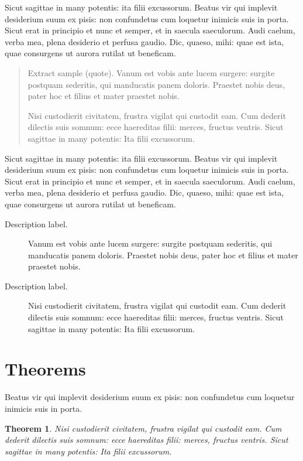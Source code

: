 \documentclass[numbers,compress]{vmsta2}
\newtheorem{thm}{Theorem}
\theoremstyle{definition}
\begin{document}
Sicut sagittae in many potentis: ita filii excussorum. Beatus vir qui
implevit desi\-derium suum ex pisis: non confundetus cum loquetur inimicis
suis in porta.  Sicut erat in principio et nunc et semper, et in saecula
saeculorum. Audi caelum, verba mea, plena desiderio et perfusa gaudio.
Dic, quaeso, mihi: quae est ista, quae consurgens ut aurora rutilat ut
beneficam.

\begin{quote}
Extract sample (quote). Vanum est vobis ante lucem surgere: surgite postquam
sederitis, qui manducatis panem doloris. Praestet nobis deus, pater
hoc et filius et mater praestet nobis.

Nisi custodierit civitatem,
frustra vigilat qui custodit eam. Cum dederit dilectis suis somnum:
ecce haereditas filii: merces, fructus ventris. Sicut sagittae in
many potentis: Ita filii excussorum.
\end{quote}

Sicut sagittae in many potentis: ita filii excussorum. Beatus vir qui
implevit desiderium suum ex pisis: non confundetus cum loquetur inimicis
suis in porta.  Sicut erat in principio et nunc et semper, et in saecula
saeculorum. Audi caelum, verba mea, plena desiderio et perfusa gaudio.
Dic, quaeso, mihi: quae est ista, quae consurgens ut aurora rutilat ut
beneficam.

\begin{description}
\item[Description label.] Vanum est vobis ante lucem surgere: surgite postquam
sederitis, qui manducatis panem doloris. Praestet nobis deus, pater
hoc et filius et mater praestet nobis.

\item[Description label.] Nisi custodierit civitatem,
frustra vigilat qui custodit eam. Cum dederit dilectis suis somnum:
ecce haereditas filii: merces, fructus ventris. Sicut sagittae in
many potentis: Ita filii excussorum.
\end{description}


\section{Theorems}

Beatus vir qui implevit desiderium
suum ex pisis: non confundetus cum loquetur inimicis suis in porta.

\begin{thm}
Nisi custodierit civitatem,
frustra vigilat qui custodit eam. Cum dederit dilectis suis somnum:
ecce haereditas filii: merces, fructus ventris. Sicut sagittae in
many potentis: Ita filii excussorum.
\end{thm}
\end{document}
